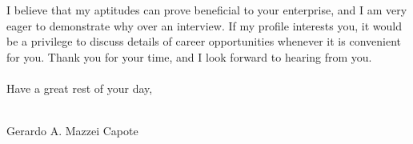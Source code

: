 \documentclass[12pt,letterpaper]{article}
\begin{document}
I believe that my aptitudes can prove beneficial to your enterprise, and I am very eager to demonstrate why over an interview. If my profile interests you, it would be a privilege to discuss details of career opportunities whenever it is convenient for you. Thank you for your time, and I look forward to hearing from you.
\\
\\
Have a great rest of your day,
\\
\\
\begin{center}
Gerardo A. Mazzei Capote
\end{center}
\end{document}
